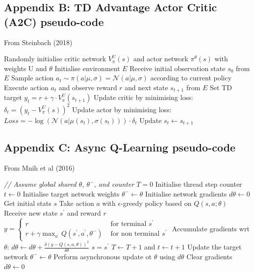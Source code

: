 \documentclass{article}
\begin{document}
\subsection*{Appendix B: TD Advantage Actor Critic (A2C) pseudo-code}
\label{async_a2c_pseudo}

From Steinbach (2018)

\begin{algorithmic}[1]
\State Randomly initialise critic network $V^{U}_{\pi}(s)$ and actor network $\pi^{\theta}(s)$ with weights U and $\theta$
\State Initialise environment $E$
\State Receive initial observation state $s_{0}$ from $E$
\State Sample action $a_{t} \sim \pi(a | \mu, \sigma) = \mathcal{N}(a | \mu, \sigma)$ according to current policy
\State Execute action $a_{t}$ and observe reward $r$ and next state $s_{t+1}$ from $E$
\State Set TD target $y_{t} = r + \gamma \cdot V^{U}_{\pi}(s_{t+1})$
\State Update critic by minimising loss: $\delta_{t} = (y_{t} - V^{U}_{\pi}(s))^{2}$
\State Update actor by minimising loss: $Loss = -\log({\mathcal{N}(a | \mu(s_{t}), \sigma(s_{t}))}) \cdot \delta_{t}$
\State Update $s_{t} {\leftarrow} s_{t+1}$
\EndFor
\EndFor
\end{algorithmic}


\subsection*{Appendix C: Async Q-Learning pseudo-code}
\label{async_q_pseudo}

From Mnih et al (2016)

\begin{algorithmic}[1]
\State \textit{// Assume global shared  $\theta$, $\theta^{-}$, and counter $T = 0$}
\State Initialise thread step counter $t \gets 0$
\State Initialise target network weights $\theta^{-} \gets \theta$
\State Initialise network gradients $d\theta \gets 0$
\State Get initial stats $s$
    \State Take action $a$ with $\epsilon$-greedy policy based on $Q\left(s,a;\theta\right)$
    \State Receive new state $s^{\prime}$ and reward $r$
    \State $y= \begin{cases}r & \text { for terminal } s^{\prime} \\ r + \gamma \max _{a^{\prime}} Q\left(s^{\prime}, a^{\prime}, \theta^{-}\right) & \text { for non terminal } s^{\prime}\end{cases}$
    \State Accumulate gradients wrt $\theta$: $d\theta \gets d\theta + \frac{\delta\left( y-Q\left(s, a, \theta\right)\right)^{2}}{\delta\theta}$
    \State $s = s^{\prime}$
    \State $T \gets T + 1$ and $t \gets t + 1$
        \State Update the target network $\theta^{-} \gets \theta$
    \EndIf
        \State Perform asynchronous update ot $\theta$ using $d\theta$
        \State Clear gradients $d\theta \gets 0$
    \EndIf
\EndWhile

\end{algorithmic}
\end{document}
